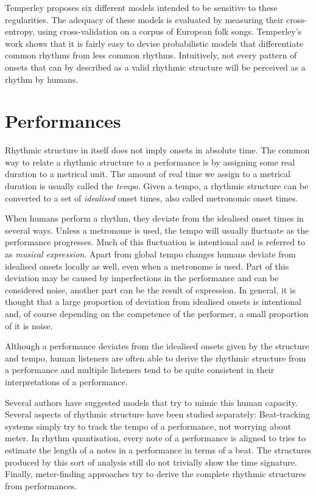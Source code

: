 Temperley proposes six different models intended to be sensitive to these regularities. The adequacy of these models is evaluated by measuring their cross-entropy, using cross-validation on a corpus of European folk songs. Temperley's work shows that it is fairly easy to devise probabilistic models that differentiate common rhythms from less common rhythms. Intuitively, not every pattern of onsets that can by described as a valid rhythmic structure will be perceived as a rhythm by humans. 


\section{Performances}
\label{sec:performances}

Rhythmic structure in itself does not imply onsets in absolute time. The common way to relate a rhythmic structure to a performance is by assigning some real duration to a metrical unit. The amount of real time we assign to a metrical duration is usually called the \textit{tempo}. Given a tempo, a rhythmic structure can be converted to a set of \textit{idealised} onset times, also called metronomic onset times. 

When humans perform a rhythm, they deviate from the idealised onset times in several ways. Unless a metronome is used, the tempo will usually fluctuate as the performance progresses. Much of this fluctuation is intentional and is referred to as \textit{musical expression}. Apart from global tempo changes humans deviate from idealised onsets locally as well, even when a metronome is used. Part of this deviation may be caused by imperfections in the performance and can be considered noise, another part can be the result of expression. In general, it is thought that a large proportion of deviation from idealised onsets is intentional and, of course depending on the competence of the performer, a small proportion of it is noise.

Although a performance deviates from the idealised onsets given by the structure and tempo, human listeners are often able to derive the rhythmic structure from a performance and multiple listeners tend to be quite consistent in their interpretations of a performance. 

Several authors have suggested models that try to mimic this human capacity. Several aspects of rhythmic structure have been studied separately: Beat-tracking systems simply try to track the tempo of a performance, not worrying about meter. In rhythm quantisation, every note of a performance is aligned to tries to estimate the length of a notes in a performance in terms of a beat. The structures produced by this sort of analysis still do not trivially show the time signature. Finally, meter-finding approaches try to derive the complete rhythmic structures from performances. 



